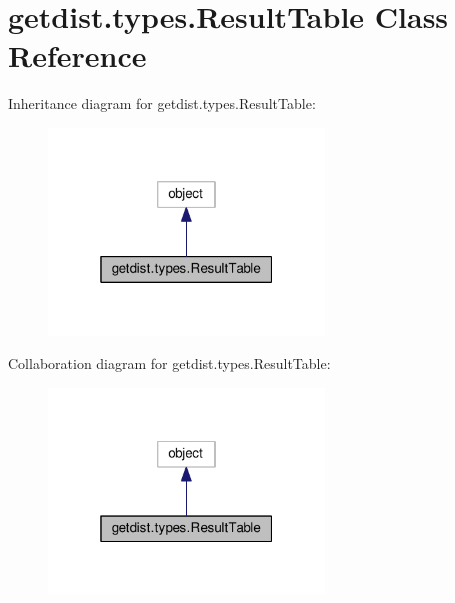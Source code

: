 \hypertarget{classgetdist_1_1types_1_1ResultTable}{}\section{getdist.\+types.\+Result\+Table Class Reference}
\label{classgetdist_1_1types_1_1ResultTable}


Inheritance diagram for getdist.\+types.\+Result\+Table\+:
\nopagebreak
\begin{figure}[H]
\begin{center}
\leavevmode
\includegraphics[width=208pt]{classgetdist_1_1types_1_1ResultTable__inherit__graph}
\end{center}
\end{figure}


Collaboration diagram for getdist.\+types.\+Result\+Table\+:
\nopagebreak
\begin{figure}[H]
\begin{center}
\leavevmode
\includegraphics[width=208pt]{classgetdist_1_1types_1_1ResultTable__coll__graph}
\end{center}
\end{figure}
